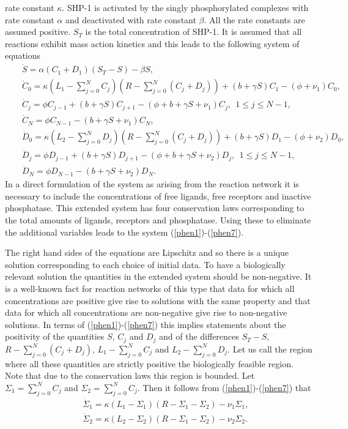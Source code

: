 \documentclass{article}
\begin{document}
rate constant $\kappa$. SHP-1 is activated by the singly phosphorylated 
complexes with rate constant $\alpha$ and deactivated with rate constant 
$\beta$. All the rate constants are assumed positive. $S_T$ is the total 
concentration of SHP-1. It is assumed that all reactions exhibit mass action
kinetics and this leads to the following system of equations
\begin{eqnarray}
&&\dot S=\alpha (C_1+D_1)(S_T-S)-\beta S,\label{phen1}\\
&&\dot C_0=\kappa (L_1-\sum_{j=0}^NC_j)(R-\sum_{j=0}^N (C_j+D_j))
+(b+\gamma S)C_1-(\phi+\nu_1)C_0,\label{phen2}\\
&&\dot C_j=\phi C_{j-1}+(b+\gamma S)C_{j+1}-(\phi+b+\gamma S+\nu_1)C_j,
\ \ 1\le j\le N-1,\label{phen3}\\
&&\dot C_N=\phi C_{N-1}-(b+\gamma S+\nu_1)C_N,\label{phen4}\\
&&\dot D_0=\kappa (L_2-\sum_{j=0}^ND_j)(R-\sum_{j=0}^N (C_j+D_j))
+(b+\gamma S)D_1-(\phi+\nu_2)D_0,\label{phen5}\\
&&\dot D_j=\phi D_{j-1}+(b+\gamma S)D_{j+1}-(\phi+b+\gamma S+\nu_2)D_j,
\ \ 1\le j\le N-1,\label{phen6}\\
&&\dot D_N=\phi D_{N-1}-(b+\gamma S+\nu_2)D_N.\label{phen7}
\end{eqnarray}
In a direct formulation of the system as arising from the reaction network 
it is necessary to include the concentrations of free ligands, free
receptors and inactive phosphatase. This extended system has four conservation
laws corresponding to the total amounts of ligands, receptors and phosphatase.
Using these to eliminate the additional variables leads to the system 
(\ref{phen1})-(\ref{phen7}).

The right hand sides of the equations are Lipschitz and so there is a unique 
solution corresponding to each choice of initial data. To have a biologically 
relevant solution the quantities in the extended system should be non-negative.
It is a well-known fact for reaction networks of this type that data for which 
all concentrations are positive give rise to solutions with the same property 
and that data for which all concentrations are non-negative give rise to 
non-negative solutions. In terms of (\ref{phen1})-(\ref{phen7}) this implies 
statements about the positivity of the quantities $S$, $C_j$ and $D_j$ and of 
the differences $S_T-S$, $R-\sum_{j=0}^N(C_j+D_j)$, $L_1-\sum_{j=0}^NC_j$ and 
$L_2-\sum_{j=0}^ND_j$. Let us call the region where all these quantities are 
strictly positive the biologically feasible region. Note that due to the 
conservation laws this region is bounded. Let $\Sigma_1=\sum_{j=0}^NC_j$ and
$\Sigma_2=\sum_{j=0}^NC_j$. Then it follows from (\ref{phen1})-(\ref{phen7})
that
\begin{eqnarray}
&&\dot\Sigma_1=\kappa(L_1-\Sigma_1)(R-\Sigma_1-\Sigma_2)-\nu_1\Sigma_1,
\label{total1}\\
&&\dot\Sigma_2=\kappa(L_2-\Sigma_2)(R-\Sigma_1-\Sigma_2)-\nu_2\Sigma_2.
\label{total2}
\end{eqnarray}
\end{document}
